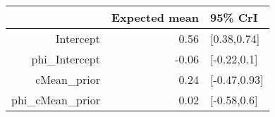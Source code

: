 \begin{tabular}{rrl}
  \hline
 & Expected mean & 95\% CrI \\ 
  \hline
Intercept & 0.56 & [0.38,0.74] \\ 
  phi\_Intercept & -0.06 & [-0.22,0.1] \\ 
  cMean\_prior & 0.24 & [-0.47,0.93] \\ 
  phi\_cMean\_prior & 0.02 & [-0.58,0.6] \\ 
   \hline
\end{tabular}

